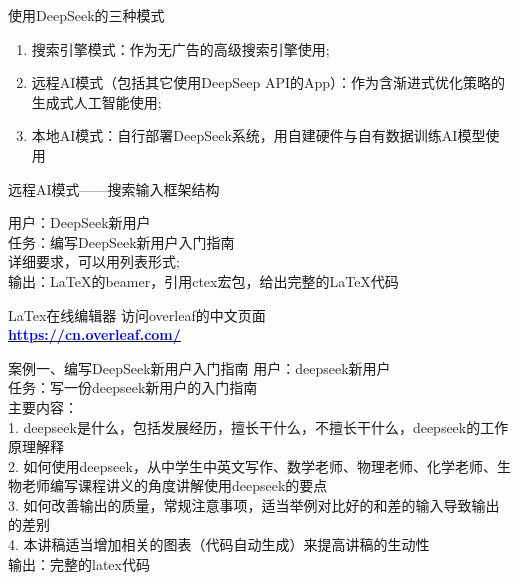 \documentclass[aspectratio=169]{beamer}
\begin{document}
\begin{frame}[t]{使用DeepSeek的三种模式}
\normalsize
\begin{spacing}{1.5}
\begin{enumerate}
  \item 搜索引擎模式：作为无广告的高级搜索引擎使用;
  \item 远程AI模式（包括其它使用DeepSeep API的App）：作为含渐进式优化策略的生成式人工智能使用;
  \item 本地AI模式：自行部署DeepSeek系统，用自建硬件与自有数据训练AI模型使用
  \end{enumerate}
\end{spacing}
\end{frame}

\begin{frame}[t]{远程AI模式——搜索输入框架结构}
\normalsize
\begin{spacing}{1.5}
\alert{用户：DeepSeek新用户}\\
\alert{任务：编写DeepSeek新用户入门指南}\\
详细要求，可以用列表形式;\\
\alert{输出：LaTeX的beamer，引用ctex宏包，给出完整的LaTeX代码}
\end{spacing}
\end{frame}

\begin{frame}[t]{LaTex在线编辑器}
\vspace*{0.5cm}
\large{访问overleaf的中文页面 }\\
\vspace*{1.5cm}
\centering
\underline{\Huge \textbf{\href{https://cn.overleaf.com/}{\textcolor{blue}{https://cn.overleaf.com/}}}}

\end{frame}

\begin{frame}[t]{案例一、编写DeepSeek新用户入门指南}
\fontsize{10pt}{14pt}\selectfont
\alert{用户：deepseek新用户}\\
\alert{任务：写一份deepseek新用户的入门指南}\\
主要内容：\\
1. deepseek是什么，包括发展经历，擅长干什么，不擅长干什么，deepseek的工作原理解释\\
2. 如何使用deepseek，从中学生中英文写作、数学老师、物理老师、化学老师、生物老师编写课程讲义的角度讲解使用deepseek的要点\\
3. 如何改善输出的质量，常规注意事项，适当举例对比好的和差的输入导致输出的差别\\
4. 本讲稿适当增加相关的图表（代码自动生成）来提高讲稿的生动性\\
\alert{输出：完整的latex代码}
\end{frame}
\end{document}
